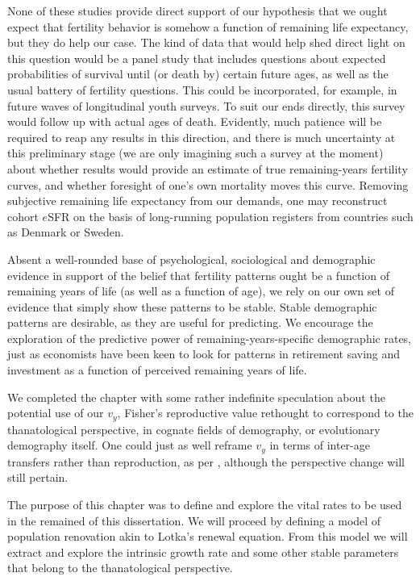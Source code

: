 None of these studies provide
direct support of our hypothesis that we ought expect that fertility behavior is
somehow a function of remaining life expectancy, but they do help our case.
The kind of data that would help shed direct light on this question would be a
panel study that includes questions about expected probabilities of survival
until (or death by) certain future ages, as well as the usual battery of 
fertility questions. This could be incorporated, for example, in future waves of
longitudinal youth surveys. To suit our ends directly, this survey would follow
up with actual ages of death. Evidently, much patience will be required to reap
any results in this direction, and there is much uncertainty at this preliminary
stage (we are only imagining such a survey at the moment) about whether results
would provide an estimate of true remaining-years fertility curves, and whether
foresight of one's own mortality moves this curve. Removing subjective
remaining life expectancy from our demands, one may reconstruct cohort $e$SFR on 
the basis of long-running population registers from countries such as Denmark or
Sweden.

Absent a well-rounded base of psychological, sociological and demographic
evidence in support of the belief that fertility patterns ought be a function of
remaining years of life (as well as a function of age), we rely on our own
set of evidence that simply show these patterns to be stable. Stable demographic
patterns are desirable, as they are useful for predicting. We encourage
the exploration of the predictive power of remaining-years-specific
demographic rates, just as economists have been keen to look for patterns in
retirement saving and investment as a function of perceived remaining years of
life.

We completed the chapter with some rather indefinite speculation about the
potential use of our $v_y$, Fisher's reproductive value rethought to correspond
to the thanatological perspective, in cognate fields of demography, or
evolutionary demography itself. One could just as well reframe $v_y$ in terms of
inter-age transfers rather than reproduction, as per \citet{lee2003rethinking},
although the perspective change will still pertain.

The purpose of this chapter was to define and explore the vital rates to be used
in the remained of this dissertation. We will proceed by defining a model of
population renovation akin to Lotka's renewal equation. From this model we will
extract and explore the intrinsic growth rate and some other stable
parameters that belong to the thanatological perspective. 

\FloatBarrier



